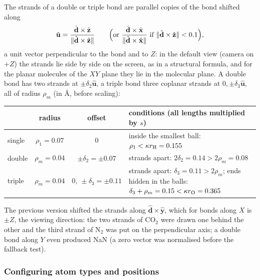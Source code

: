 \documentclass[a4paper, 11pt]{article}
\begin{document}
The strands of a double or triple bond are parallel copies of the bond shifted along
\[
  \hat{\mathbf u}=\frac{\hat{\mathbf d}\times\hat{\mathbf z}}{\|\hat{\mathbf d}\times\hat{\mathbf z}\|}
  \qquad\Bigl(\text{or }\frac{\hat{\mathbf d}\times\hat{\mathbf x}}{\|\hat{\mathbf d}\times\hat{\mathbf x}\|}\text{ if }\|\hat{\mathbf d}\times\hat{\mathbf z}\|<0.1\Bigr),
\]
a unit vector perpendicular to the bond and to $Z$: in the default view (camera on $+Z$) the strands lie side by side on the screen, as in a
structural formula, and for the planar molecules of the $XY$ plane they lie in the molecular plane. A double bond has two strands at
$\pm\delta_2\hat{\mathbf u}$, a triple bond three coplanar strands at $0,\pm\delta_3\hat{\mathbf u}$, all of radius $\rho_m$ (in {\AA}, before scaling):
\begin{center}
\small
\begin{tabularx}{\textwidth}{@{}lccX@{}}
\toprule
 & radius & offset & conditions (all lengths multiplied by $s$)\\
\midrule
single & $\rho_1=0.07$ & $0$ & inside the smallest ball: $\rho_1<\kappa r_{\text H}=0.155$\\
double & $\rho_m=0.04$ & $\pm\delta_2=\pm0.07$ & strands apart: $2\delta_2=0.14>2\rho_m=0.08$\\
triple & $\rho_m=0.04$ & $0,\ \pm\delta_3=\pm0.11$ & strands apart: $\delta_3=0.11>2\rho_m$; ends hidden in the balls: $\delta_3+\rho_m=0.15<\kappa r_{\text O}=0.365$\\
\bottomrule
\end{tabularx}
\end{center}
The previous version shifted the strands along $\hat{\mathbf d}\times\hat{\mathbf y}$, which for bonds along $X$ is $\pm Z$, the viewing direction:
the two strands of CO$_2$ were drawn one behind the other and the third strand of N$_2$ was put on the perpendicular axis; a double bond along $Y$
even produced NaN (a zero vector was normalised before the fallback test).

\subsubsection{Configuring atom types and positions}\label{sec:editor}
\end{document}
